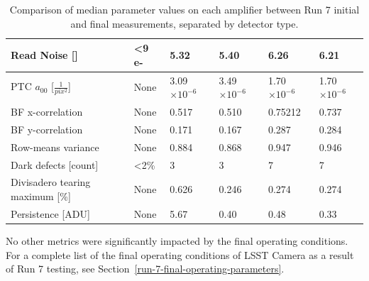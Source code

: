 \begin{table}[ht]
{\begin{tabular}{|l|l|ll|ll|}
Read Noise {[}{]}           &                      <9 e-        & \multicolumn{1}{l|}{5.32}              &      5.40      & \multicolumn{1}{l|}{6.26}              &      6.21     \\ \hline
PTC $a_{00}$ [$\frac{1}{pix^2}$]  &      None                          & \multicolumn{1}{l|}{3.09$\times10^{-6}$}              &       3.49$\times10^{-6}$      & \multicolumn{1}{l|}{1.70$\times10^{-6}$}              &        1.70$\times10^{-6}$     \\ \hline
BF x-correlation                  &      None                          & \multicolumn{1}{l|}{0.517}              &     0.510        & \multicolumn{1}{l|}{0.75212}              &       0.737      \\ \hline
BF y-correlation                  &        None                        & \multicolumn{1}{l|}{0.171}              &       0.167      & \multicolumn{1}{l|}{0.287}              &        0.284     \\ \hline
Row-means variance                &       None                         & \multicolumn{1}{l|}{0.884}              &      0.868       & \multicolumn{1}{l|}{0.947}              &        0.946     \\ \hline
Dark defects {[}count{]}          &       <2\%                          & \multicolumn{1}{l|}{3}              &       3      & \multicolumn{1}{l|}{7}              &       7      \\ \hline
Divisadero tearing maximum {[}\%{]} &     None                     & \multicolumn{1}{l|}{0.626}              &       0.246      & \multicolumn{1}{l|}{0.274}              &       0.274      \\ \hline
Persistence {[}ADU{]}             &       None                         & \multicolumn{1}{l|}{5.67}              &       0.40      & \multicolumn{1}{l|}{0.48}              &       0.33      \\ \hline
\end{tabular}
}
\caption{Comparison of median parameter values on each amplifier between Run 7 initial and final measurements, separated by detector type.}
\label{table:FinalChar-paramTable}
\end{table}      



No other metrics were significantly impacted by the final operating conditions. For a complete list of the final operating conditions of LSST Camera as a result of Run 7 testing, see Section~\ref{run-7-final-operating-parameters}.


